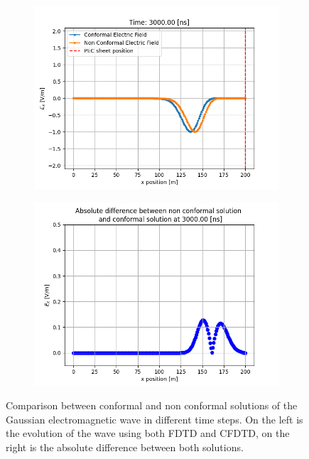 \documentclass[12pt, oneside]{book}
\begin{document}
\begin{figure}[H]
    \begin{subfigure}[b]{0.45\textwidth}
        \centering
        \includegraphics[width=\textwidth]{Imagenes/CFDTD1D_Comparison4.png}
    \end{subfigure}
    \begin{subfigure}[b]{0.45\textwidth}
        \centering
        \includegraphics[width=\textwidth]{Imagenes/CFDTD1D_DelayDifference4.png}
    \end{subfigure}
    \caption{Comparison between conformal and non conformal solutions of the Gaussian electromagnetic wave in different time steps. On the left is the evolution of the wave using both FDTD and CFDTD, on the right is the absolute difference between both solutions.}
    \label{fig:CFDTD1D_Delay}
\end{figure}
\end{document}
